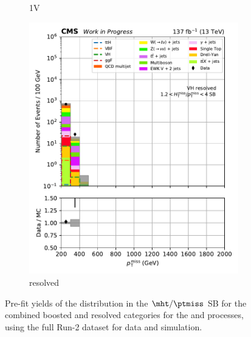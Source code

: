 \begin{figure}[htbp]
\begin{subfigure}[b]{0.24\textwidth}
        \caption{\VH 1V}
    \end{subfigure}
    \hfill
    \begin{subfigure}[b]{0.24\textwidth}
        \includegraphics[width=\textwidth]{figures/region_plots/full_Run2/sideband_2/VH_resolved.pdf}
        \caption{\VH resolved}
    \end{subfigure}
    \caption[Pre-fit yields of the \ptmiss distribution in the $\mht/\ptmiss$ sideband for the combined boosted and resolved categories for the \ttH and \VH processes, using the full Run-2 dataset for data and simulation]{Pre-fit yields of the \ptmiss distribution in the $\mht/\ptmiss$ \gls{SB} for the combined boosted and resolved categories for the \ttH and \VH processes, using the full Run-2 dataset for data and simulation.}
    \label{fig:htoinv_sb_yields_comb2016to18_mht_met}
\end{figure}

